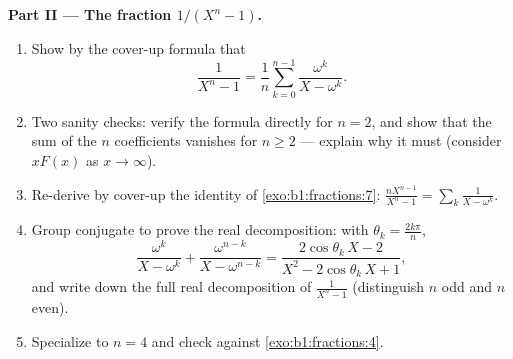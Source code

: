 \begin{problem}
\medskip
\noindent\textbf{Part II --- The fraction $1/(X^n - 1)$.}
\begin{enumerate}[resume]
  \item Show by the cover-up formula that
        \[
        \frac{1}{X^n - 1}
        = \frac1n\sum_{k=0}^{n-1}\frac{\omega^k}{X - \omega^k} .
        \]
  \item Two sanity checks: verify the formula directly for $n =
        2$, and show that the sum of the $n$ coefficients
        vanishes for $n \geq 2$ --- explain why it must (consider
        $xF(x)$ as $x \to \infty$).
  \item Re-derive by cover-up the identity of
        \cref{exo:b1:fractions:7}:
        $\frac{nX^{n-1}}{X^n-1} = \sum_k \frac1{X - \omega^k}$.
  \item Group conjugate  to prove the real decomposition:
        with $\theta_k = \frac{2k\pi}n$,
        \[
        \frac{\omega^k}{X - \omega^k} +
        \frac{\omega^{n-k}}{X - \omega^{n-k}}
        = \frac{2\cos\theta_k\,X - 2}
        {X^2 - 2\cos\theta_k\,X + 1} ,
        \]
        and write down the full real decomposition of
        $\frac1{X^n-1}$ (distinguish $n$ odd and $n$ even).
  \item Specialize to $n = 4$ and check against
        \cref{exo:b1:fractions:4}.
\end{enumerate}


\end{problem}
